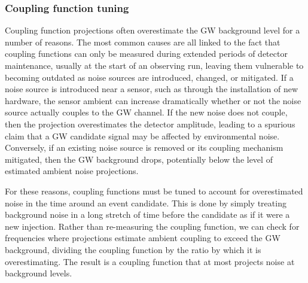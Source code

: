 \subsubsection{Coupling function tuning}

Coupling function projections often overestimate the \ac{GW} background level for a number of reasons.
The most common causes are all linked to the fact that coupling functions can only be measured during extended periods of detector maintenance, usually at the start of an observing run, leaving them vulnerable to becoming outdated as noise sources are introduced, changed, or mitigated.
If a noise source is introduced near a sensor, such as through the installation of new hardware, the sensor ambient can increase dramatically whether or not the noise source actually couples to the \ac{GW} channel.
If the new noise does not couple, then the projection overestimates the detector amplitude, leading to a spurious claim that a \ac{GW} candidate signal may be affected by environmental noise.
Conversely, if an existing noise source is removed or its coupling mechanism mitigated, then the \ac{GW} background drops, potentially below the level of estimated ambient noise projections.

For these reasons, coupling functions must be tuned to account for overestimated noise in the time around an event candidate.
This is done by simply treating background noise in a long stretch of time before the candidate as if it were a new injection.
Rather than re-measuring the coupling function, we can check for frequencies where projections estimate ambient coupling to exceed the \ac{GW} background, dividing the coupling function by the ratio by which it is overestimating.
The result is a coupling function that at most projects noise at background levels.

